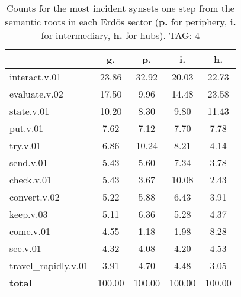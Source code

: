\begin{table}[h!]
\begin{center}
\begin{tabular}{| l || c | c | c | c |}\hline
 & {\bf g.} & {\bf p.} & {\bf i.} & {\bf h.} \\\hline\hline
interact.v.01 & 23.86  & 32.92  & 20.03  & 22.73 \\\hline
evaluate.v.02 & 17.50  & 9.96  & 14.48  & 23.58 \\\hline
state.v.01 & 10.20  & 8.30  & 9.80  & 11.43 \\\hline
put.v.01 & 7.62  & 7.12  & 7.70  & 7.78 \\\hline
try.v.01 & 6.86  & 10.24  & 8.21  & 4.14 \\\hline
send.v.01 & 5.43  & 5.60  & 7.34  & 3.78 \\\hline
check.v.01 & 5.43  & 3.67  & 10.08  & 2.43 \\\hline
convert.v.02 & 5.22  & 5.88  & 6.43  & 3.91 \\\hline
keep.v.03 & 5.11  & 6.36  & 5.28  & 4.37 \\\hline
come.v.01 & 4.55  & 1.18  & 1.98  & 8.28 \\\hline
see.v.01 & 4.32  & 4.08  & 4.20  & 4.53 \\\hline
travel\_rapidly.v.01 & 3.91  & 4.70  & 4.48  & 3.05 \\\hline\hline
{{\bf total}} & 100.00  & 100.00  & 100.00  & 100.00 \\\hline
\end{tabular}
\caption{Counts for the most incident synsets one step from the semantic roots in each Erd\"os sector ({\bf p.} for periphery, {\bf i.} for intermediary, {\bf h.} for hubs). TAG: 4}
\end{center}
\end{table}